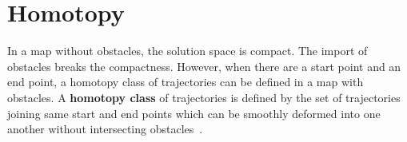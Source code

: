 \section{Homotopy}

In a map without obstacles, the solution space is compact.
The import of obstacles breaks the compactness.
However, when there are a start point and an end point, a homotopy class of trajectories can be defined in a map with obstacles.
A \textbf{homotopy class} of trajectories is defined by the set of trajectories joining same start and end points which can be smoothly deformed into one another without intersecting obstacles~\cite{bhattacharya2010search}.


